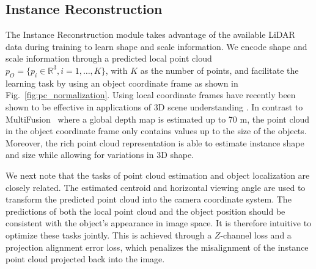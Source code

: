 \documentclass[10pt,twocolumn,letterpaper]{article}
\begin{document}
	\subsection{Instance Reconstruction} \label{sec:instance_reconstruction}
	The Instance Reconstruction module takes advantage of the available LiDAR data during training to learn shape and scale information. We encode shape and scale information through a predicted local point cloud $p_O=\{p_i \in \mathbb{R}^3, i=1,\dots, K\}$, with $K$ as the number of points, and facilitate the learning task by using an object coordinate frame as shown in Fig.~\ref{fig:pc_normalization}. Using local coordinate frames have recently been shown to be effective in applications of 3D scene understanding \cite{qi_fpointnet, rematas_soccer}. In contrast to MultiFusion~\cite{xu_multifusion} where a global depth map is estimated up to 70 m, the point cloud in the object coordinate frame only contains values up to the size of the objects. Moreover, the rich point cloud representation is able to estimate instance shape and size while allowing for variations in 3D shape.
	
	We next note that the tasks of point cloud estimation and object localization are closely related. The estimated centroid and horizontal viewing angle are used to transform the predicted point cloud into the camera coordinate system. The predictions of both the local point cloud and the object position should be consistent with the object's appearance in image space. It is therefore intuitive to optimize these tasks jointly. This is achieved through a $Z$-channel loss and a projection alignment error loss, which penalizes the misalignment of the instance point cloud projected back into the image.
	
\end{document}
